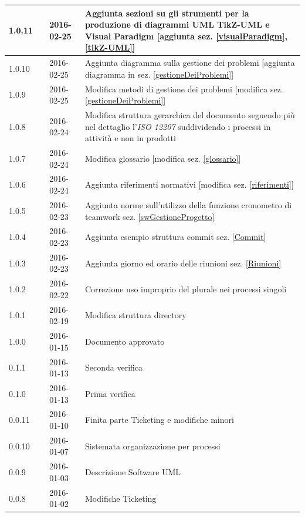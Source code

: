 \documentclass[12pt,a4paper]{article}
\begin{document}
\begin{center}
\begin{longtable}[H]{p{} p{} p{} p{}}
		\midrule
		1.0.11 & \TP{} & 2016-02-25 & Aggiunta sezioni su gli strumenti per la produzione di diagrammi UML TikZ-UML e Visual Paradigm [aggiunta sez. \ref{visualParadigm},\ref{tikZ-UML}]\\*
		\midrule
		1.0.10 & \TP{} & 2016-02-25 & Aggiunta diagramma sulla gestione dei problemi [aggiunta diagramma in sez. \ref{gestioneDeiProblemi}] \\*
		\midrule
		1.0.9 & \TP{} & 2016-02-25 & Modifica metodi di gestione dei problemi [modifica sez. \ref{gestioneDeiProblemi}]  \\*
		\midrule
		1.0.8 & \TP{} & 2016-02-24 & Modifica struttura gerarchica del documento seguendo più nel dettaglio l'\textit{ISO 12207} suddividendo i processi in attività e non in prodotti \\*
		\midrule
		1.0.7 & \TP{} & 2016-02-24 & Modifica glossario [modifica sez. \ref{glossario}] \\*
		\midrule
		1.0.6 & \TP{} & 2016-02-24 & Aggiunta riferimenti normativi [modifica sez. \ref{riferimenti}] \\*
		\midrule
		1.0.5 & \TP & 2016-02-23 & Aggiunta norme sull'utilizzo della funzione cronometro di teamwork sez. \ref{swGestioneProgetto}\\*
		\midrule
		1.0.4 & \TP & 2016-02-23 & Aggiunta esempio struttura commit sez. \ref{Commit}\\*
		\midrule
		1.0.3 & \TP & 2016-02-23 & Aggiunta giorno ed orario delle riunioni sez. \ref{Riunioni}\\*
		\midrule
		1.0.2 & \TP & 2016-02-22 & Correzione uso improprio del plurale nei processi singoli \\*
		\midrule
		1.0.1 & \TP & 2016-02-19 & Modifica struttura directory \\*
		\midrule
		1.0.0 & \IB & 2016-01-15 & Documento approvato \\*
		\midrule
		0.1.1 & \TP & 2016-01-13 & Seconda verifica \\*
		\midrule
		0.1.0 & \WS & 2016-01-13 & Prima verifica \\*
		\midrule
		0.0.11 & \NDC & 2016-01-10 & Finita parte Ticketing e modifiche minori \\*
		\midrule
		0.0.10 & \NDC & 2016-01-07 & Sistemata organizzazione per processi \\*
		\midrule
		0.0.9 & \AVE & 2016-01-03 & Descrizione Software UML \\*
		\midrule
		0.0.8 & \AVE & 2016-01-02 & Modifiche Ticketing \\*
		\midrule

\end{longtable}
\end{center}
\end{document}
